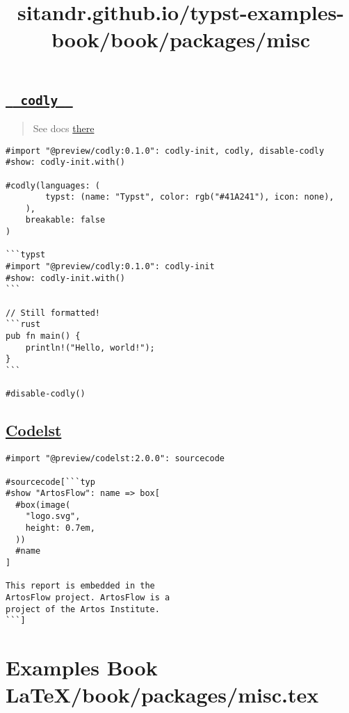 \subsection{\texorpdfstring{\hyperref[codly]{\texttt{\ }{\texttt{\ codly\ }}\texttt{\ }}}{  codly  }}\label{codly}

\begin{quote}
See docs \href{https://github.com/Dherse/codly}{there}
\end{quote}

\begin{verbatim}
#import "@preview/codly:0.1.0": codly-init, codly, disable-codly
#show: codly-init.with()

#codly(languages: (
        typst: (name: "Typst", color: rgb("#41A241"), icon: none),
    ),
    breakable: false
)

```typst
#import "@preview/codly:0.1.0": codly-init
#show: codly-init.with()
```

// Still formatted!
```rust
pub fn main() {
    println!("Hello, world!");
}
```

#disable-codly()
\end{verbatim}

\pandocbounded{}

\subsection{\texorpdfstring{\hyperref[codelst]{Codelst}}{Codelst}}\label{codelst}

\begin{verbatim}
#import "@preview/codelst:2.0.0": sourcecode

#sourcecode[```typ
#show "ArtosFlow": name => box[
  #box(image(
    "logo.svg",
    height: 0.7em,
  ))
  #name
]

This report is embedded in the
ArtosFlow project. ArtosFlow is a
project of the Artos Institute.
```]
\end{verbatim}

\pandocbounded{}


\section{Examples Book LaTeX/book/packages/misc.tex}
\title{sitandr.github.io/typst-examples-book/book/packages/misc}


